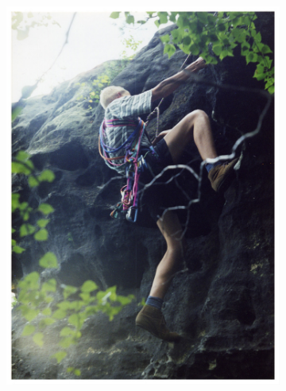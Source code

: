 \begin{frame}[standout]
\begin{figure}[h]
\begin{subfigure}[t]{0.49\columnwidth}
		\includegraphics[angle=-5,width=\textwidth]{include/images/2002.jpg}
	\end{subfigure}
\end{figure}
\end{frame}

